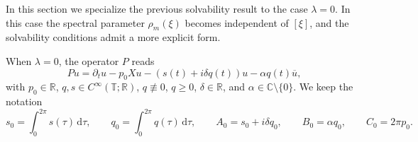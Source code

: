 \documentclass[11pt,reqno]{amsart}
\numberwithin{equation}{section}
\begin{document}
	In this section we specialize the previous solvability result to the case $\lambda=0$. In this case the spectral parameter $\rho_m(\xi)$ becomes independent of $[\xi]$, and the solvability conditions admit a more explicit form.
	
	When $\lambda=0$, the operator $P$ reads
	\begin{equation}\label{eq:P_lambda0}
		Pu=\partial_t u-p_0Xu-(s(t)+i\delta q(t))u-\alpha q(t)\overline{u},
	\end{equation}
	with $p_0\in\mathbb{R}$, $q,s\in C^\infty(\mathbb{T};\mathbb{R})$, $q\not\equiv 0$, $q\ge 0$, $\delta\in\mathbb{R}$, and $\alpha\in\mathbb{C}\setminus\{0\}$.
	We keep the notation
	\[
	s_0=\int_0^{2\pi}s(\tau)\,\mathrm{d}\tau,\qquad
	q_0=\int_0^{2\pi}q(\tau)\,\mathrm{d}\tau,\qquad
	A_0=s_0+i\delta q_0,\qquad
	B_0=\alpha q_0,\qquad
	C_0=2\pi p_0.
	\]
	
\end{document}
